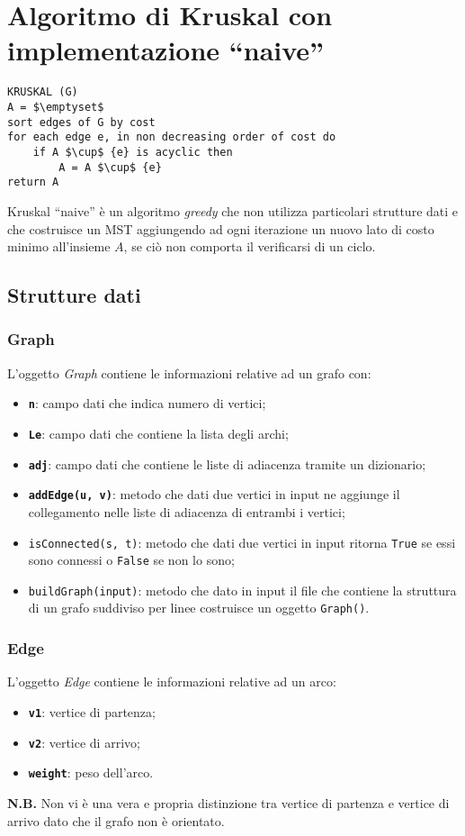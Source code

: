 \section{Algoritmo di Kruskal con implementazione ``naive''}\label{kruskal_naive}

\begin{lstlisting}[mathescape=true]
KRUSKAL (G)
A = $\emptyset$
sort edges of G by cost
for each edge e, in non decreasing order of cost do
	if A $\cup$ {e} is acyclic then
		A = A $\cup$ {e}
return A	
\end{lstlisting}

Kruskal ``naive'' è un algoritmo \textit{greedy} che non utilizza particolari strutture dati e che costruisce un MST aggiungendo ad ogni iterazione un nuovo lato di costo minimo all'insieme $A$, se ciò non comporta il verificarsi di un ciclo.

\subsection{Strutture dati}
	\subsubsection{Graph}\label{kruskal_naive_graph}
	L'oggetto \textit{Graph} contiene le informazioni relative ad un grafo con:
	\begin{itemize}
		\item \texttt{\textbf{n}}: campo dati che indica numero di vertici;
		\item \texttt{\textbf{Le}}: campo dati che contiene la lista degli archi;
		\item \texttt{\textbf{adj}}: campo dati che contiene le liste di adiacenza tramite un dizionario;
		\item \texttt{\textbf{addEdge(u, v)}}: metodo che dati due vertici in input ne aggiunge il collegamento nelle liste di adiacenza di entrambi i vertici;
		\item \texttt{isConnected(s, t)}: metodo che dati due vertici in input ritorna \texttt{True} se essi sono connessi o \texttt{False} se non lo sono;
		\item \texttt{buildGraph(input)}: metodo che dato in input il file che contiene la struttura di un grafo suddiviso per linee costruisce un oggetto \texttt{Graph()}.
	\end{itemize} 

	\subsubsection{Edge}\label{kruskal_naive_edge}
		L'oggetto \textit{Edge} contiene le informazioni relative ad un arco:
		\begin{itemize}
			\item \texttt{\textbf{v1}}: vertice di partenza;
			\item \texttt{\textbf{v2}}: vertice di arrivo;
			\item \texttt{\textbf{weight}}: peso dell'arco.
		\end{itemize}
		\textbf{N.B.} Non vi è una vera e propria distinzione tra vertice di partenza e vertice di arrivo dato che il grafo non è orientato.

